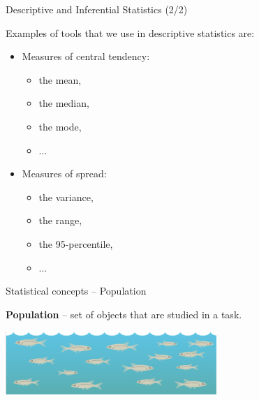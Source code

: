 \documentclass{beamer}
\begin{document}
\begin{frame}
{\centerline{Descriptive and Inferential Statistics (2/2)}}

Examples of tools that we use in descriptive statistics are:
\begin{itemize}
\item Measures of central tendency:
\begin{itemize}
\item the mean,
\item the median, 
\item the mode,
\item $\ldots{}$
\end{itemize}
\item Measures of spread:
\begin{itemize}
\item the variance,
\item the range,
\item the 95-percentile,
\item $\ldots{}$
\end{itemize}
\end{itemize}

\end{frame}


\begin{frame}
{\centerline{Statistical concepts -- Population}}
\textbf{Population} -- set of objects that are studied in a task.



\begin{center}
\includegraphics[width=8cm]{A2022.IDSEPC.SperimentazioneDeduzione/pop-1.png}
\end{center} 

\end{frame}

\end{document}
